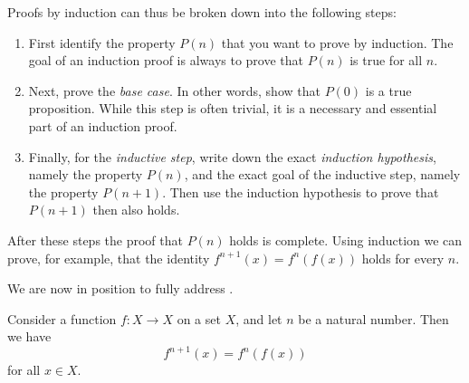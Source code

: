 \begin{remark}
  Proofs by induction can thus be broken down into the following steps:
  \begin{enumerate}
  \item First identify the property $P(n)$ that you want to prove by induction. The goal of an induction proof is always to prove that $P(n)$ is true for all $n$.
  \item Next, prove the \emph{base case}. In other words, show that $P(0)$ is a true proposition. While this step is often trivial, it is a necessary and essential part of an induction proof.
  \item Finally, for the \emph{inductive step}, write down the exact \emph{induction hypothesis}, namely the property $P(n)$, and the exact goal of the inductive step, namely the property $P(n+1)$. Then use the induction hypothesis to prove that $P(n+1)$ then also holds.
  \end{enumerate}
  After these steps the proof that $P(n)$ holds is complete. Using induction we can prove, for example, that the identity $f^{n+1}(x)=f^n(f(x))$ holds for every $n$.  
\end{remark}

We are now in position to fully address .

\begin{proposition}\label{proposition:iterate-successor}
  Consider a function $f:X\to X$ on a set $X$, and let $n$ be a natural number. Then we have
  \begin{equation*}
    f^{n+1}(x) = f^n(f(x))
  \end{equation*}
  for all $x\in X$.
\end{proposition}

